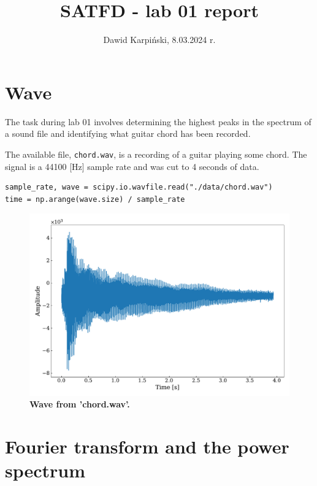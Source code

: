 \documentclass[13pt,a4paper]{article}
\begin{document}
\title{
    \LARGE
    \textbf{SATFD - lab 01 report}
}
\author{
    \large
    Dawid Karpiński, 8.03.2024 r.
}
\date{}
\maketitle

\section{Wave}

The task during lab 01 involves determining the highest peaks in the spectrum of a sound file and identifying what guitar chord has been recorded.

The available file, \verb|chord.wav|, is a recording of a guitar playing some chord. The signal is a 44100 [Hz] sample rate and was cut to 4 seconds of data.

\begin{lstlisting}[caption={\textbf{Code snippet for loading the initial signal.}}]
sample_rate, wave = scipy.io.wavfile.read("./data/chord.wav")
time = np.arange(wave.size) / sample_rate
\end{lstlisting}

\begin{figure}[ht!]
    \centering
    \caption{\textbf{Wave from 'chord.wav'.}}
    \includegraphics[width=1\textwidth]{wave.pdf}
\end{figure}

\pagebreak
\section{Fourier transform and the power spectrum}
\end{document}
